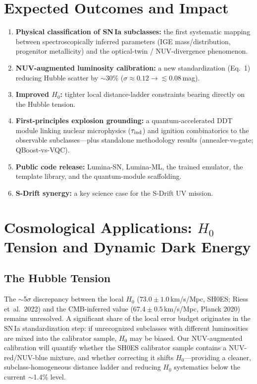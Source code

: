 \documentclass[11pt]{article}
\begin{document}
\section{Expected Outcomes and Impact}
\begin{enumerate}[leftmargin=1.5em]
\item \textbf{Physical classification of SN\,Ia subclasses:} the first systematic mapping between
spectroscopically inferred parameters (IGE mass/distribution, progenitor metallicity) and the
optical-twin / NUV-divergence phenomenon.
\item \textbf{NUV-augmented luminosity calibration:} a new standardization (Eq.~1) reducing Hubble
scatter by $\sim$30\% ($\sigma\approx0.12\to\lesssim0.08$\,mag).
\item \textbf{Improved $H_0$:} tighter local distance-ladder constraints bearing directly on the
Hubble tension.
\item \textbf{First-principles explosion grounding:} a quantum-accelerated DDT module linking nuclear
microphysics ($\tau_{\rm ind}$) and ignition combinatorics to the observable subclasses---plus
standalone methodology results (annealer-vs-gate; QBoost-vs-VQC).
\item \textbf{Public code release:} Lumina-SN, Lumina-ML, the trained emulator, the template library,
and the quantum-module scaffolding.
\item \textbf{S-Drift synergy:} a key science case for the S-Drift UV mission.
\end{enumerate}

\section{Cosmological Applications: $H_0$ Tension and Dynamic Dark Energy}

\subsection{The Hubble Tension}
The $\sim$5$\sigma$ discrepancy between the local $H_0$ ($73.0\pm1.0$\,km/s/Mpc, SH0ES; Riess
et~al.\ 2022) and the CMB-inferred value ($67.4\pm0.5$\,km/s/Mpc, Planck 2020) remains unresolved. A
significant share of the local error budget originates in the SN\,Ia standardization step: if
unrecognized subclasses with different luminosities are mixed into the calibrator sample, $H_0$ may
be biased. Our NUV-augmented calibration will quantify whether the SH0ES calibrator sample contains
a NUV-red/NUV-blue mixture, and whether correcting it shifts $H_0$---providing a cleaner,
subclass-homogeneous distance ladder and reducing $H_0$ systematics below the current $\sim$1.4\%
level.
\end{document}
